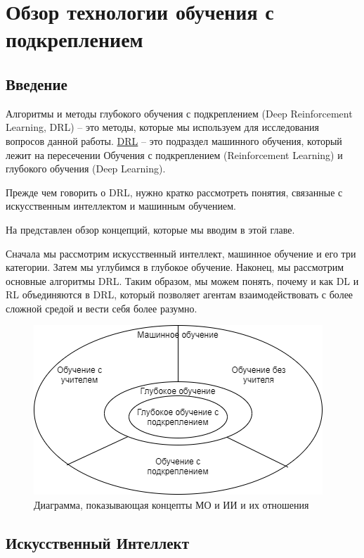 \chapter{Обзор технологии обучения с подкреплением} \label{ch1}

\section{Введение} \label{ch1:intro}

Алгоритмы и методы глубокого обучения с подкреплением (Deep Reinforcement Learning, DRL) – это методы, которые мы используем для исследования вопросов данной работы. \hyperref[acr:drl]{DRL} – это подраздел машинного обучения, который лежит на пересечении Обучения с подкреплением (Reinforcement Learning) и глубокого обучения (Deep Learning).

Прежде чем говорить о DRL, нужно кратко рассмотреть понятия, связанные с искусственным интеллектом и машинным обучением.

На  представлен обзор концепций, которые мы вводим в этой главе. 

Сначала мы рассмотрим искусственный интеллект, машинное обучение и его три категории. Затем мы углубимся в глубокое обучение. Наконец, мы рассмотрим основные алгоритмы DRL.
Таким образом, мы можем понять, почему и как DL и RL объединяются в DRL, который позволяет агентам взаимодействовать с более сложной средой и вести себя более разумно.

\begin{figure}[ht!] 
	\center
	\includegraphics [scale=0.80] {my_folder/images/ch1/ML-and-AI-concepts.png}
	\caption{Диаграмма, показывающая концепты МО и ИИ и их отношения} 
	\label{fig:ch1-ML-and-AI-concepts}  
\end{figure}

\section{Искусственный Интеллект} \label{ch1:ai}

